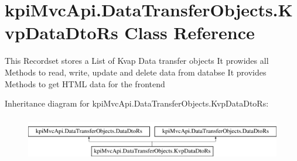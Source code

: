\hypertarget{classkpi_mvc_api_1_1_data_transfer_objects_1_1_kvp_data_dto_rs}{}\section{kpi\+Mvc\+Api.\+Data\+Transfer\+Objects.\+Kvp\+Data\+Dto\+Rs Class Reference}
\label{classkpi_mvc_api_1_1_data_transfer_objects_1_1_kvp_data_dto_rs}


This Recordset stores a List of Kvap Data transfer objects It prowides all Methods to read, write, update and delete data from databse It provides Methods to get H\+T\+ML data for the frontend  


Inheritance diagram for kpi\+Mvc\+Api.\+Data\+Transfer\+Objects.\+Kvp\+Data\+Dto\+Rs\+:\begin{figure}[H]
\begin{center}
\leavevmode
\includegraphics[height=1.958042cm]{classkpi_mvc_api_1_1_data_transfer_objects_1_1_kvp_data_dto_rs}
\end{center}
\end{figure}
